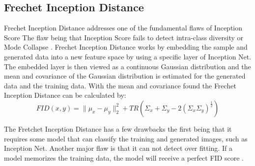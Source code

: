 \subsection{Frechet Inception Distance}
\label{sub:Frechet Inception Distance}

\begin{comment}
    how:
        The real and fake data is embedded into the inception network.
        Looks at embedded layer as a Multi-variant-Guassian distribution
        Find mean and covariance for embedded layer
        
    Good: IS can not detect intra-class Mode-Collapse but FID can. (can detect if only makes one image per class) will have bad FID Score
    More robust to noise then IS
    
    Bad:
        Needs Inception Net (that is googles thing?)
        Can not detect over fitting if Memory Gan (A gan that memorizes the training set) will score perfectly with FID.
        Needs a model to classify output.
        
\end{comment}


Frechet Inception Distance addresses one of the fundamental flaws of Inception Score
The flaw being that Inception Score fails to detect intra-class diversity or Mode Collapse \cite{borji2018pros}. 
Frechet Inception Distance works by embedding the sample and generated data into a new feature space by using a specific layer of Inception Net. 
The embedded layer is then viewed as a continuous Gaussian distribution and the mean and covariance of the Gaussian distribution is estimated for the generated data and the training data. 
With the mean and covariance found the Frechet Inception Distance can be calculated by:
\begin{equation}
    FID(x,y) = \| \mu_x - \mu_y \|_2^2 + TR(\Sigma_x + \Sigma_y - 2(\Sigma_x\Sigma_y)^{\frac{1}{2}})
\end{equation}

The Fretchet Inception Distance has a few drawbacks the first being that it requires some model that can classify the training and generated images, such as Inception Net.
Another major flaw is that it can not detect over fitting.
If a model memorizes the training data, the model will receive a perfect FID score \cite{lucic2017gans}.

